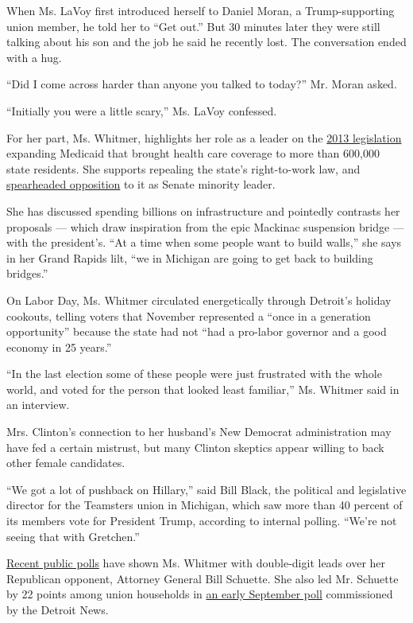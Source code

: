 When Ms. LaVoy first introduced herself to Daniel Moran, a
Trump-supporting union member, he told her to ``Get out.'' But 30
minutes later they were still talking about his son and the job he said
he recently lost. The conversation ended with a hug.

``Did I come across harder than anyone you talked to today?'' Mr. Moran
asked.

``Initially you were a little scary,'' Ms. LaVoy confessed.

For her part, Ms. Whitmer, highlights her role as a leader on the
\href{https://www.nytimes.com/2013/08/28/us/medicaid-expansion-battle-in-michigan-ends-in-passage.html}{2013
legislation} expanding Medicaid that brought health care coverage to
more than 600,000 state residents. She supports repealing the state's
right-to-work law, and
\href{https://www.detroitnews.com/story/news/local/michigan/2018/09/03/right-work-michigan-governor-campaign/1156349002/}{spearheaded
opposition} to it as Senate minority leader.

She has discussed spending billions on infrastructure and pointedly
contrasts her proposals --- which draw inspiration from the epic
Mackinac suspension bridge --- with the president's. ``At a time when
some people want to build walls,'' she says in her Grand Rapids lilt,
``we in Michigan are going to get back to building bridges.''

On Labor Day, Ms. Whitmer circulated energetically through Detroit's
holiday cookouts, telling voters that November represented a ``once in a
generation opportunity'' because the state had not ``had a pro-labor
governor and a good economy in 25 years.''

``In the last election some of these people were just frustrated with
the whole world, and voted for the person that looked least familiar,''
Ms. Whitmer said in an interview.

Mrs. Clinton's connection to her husband's New Democrat administration
may have fed a certain mistrust, but many Clinton skeptics appear
willing to back other female candidates.

``We got a lot of pushback on Hillary,'' said Bill Black, the political
and legislative director for the Teamsters union in Michigan, which saw
more than 40 percent of its members vote for President Trump, according
to internal polling. ``We're not seeing that with Gretchen.''

\href{https://projects.fivethirtyeight.com/polls/michigan/?states=UT}{Recent
public polls} have shown Ms. Whitmer with double-digit leads over her
Republican opponent, Attorney General Bill Schuette. She also led Mr.
Schuette by 22 points among union households in
\href{https://www.detroitnews.com/story/news/local/michigan/2018/09/11/michigan-whitmer-schuette-governor-poll-september/1256313002/}{an
early September poll} commissioned by the Detroit News.

